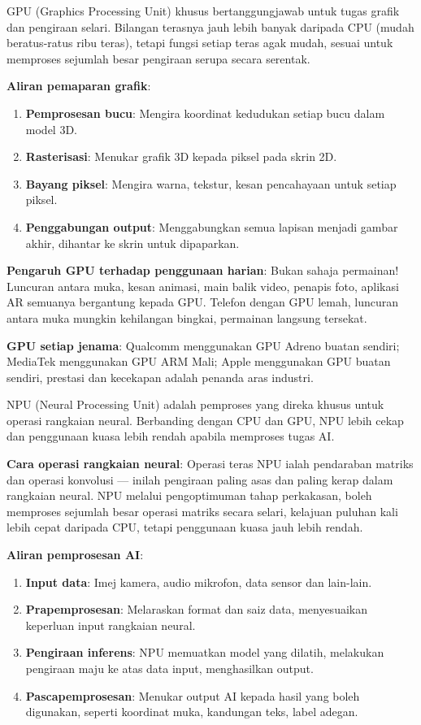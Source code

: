 
GPU (Graphics Processing Unit) khusus bertanggungjawab untuk tugas grafik dan pengiraan selari. Bilangan terasnya jauh lebih banyak daripada CPU (mudah beratus-ratus ribu teras), tetapi fungsi setiap teras agak mudah, sesuai untuk memproses sejumlah besar pengiraan serupa secara serentak.

\textbf{Aliran pemaparan grafik}:

\begin{enumerate}
  \item \textbf{Pemprosesan bucu}: Mengira koordinat kedudukan setiap bucu dalam model 3D.
  \item \textbf{Rasterisasi}: Menukar grafik 3D kepada piksel pada skrin 2D.
  \item \textbf{Bayang piksel}: Mengira warna, tekstur, kesan pencahayaan untuk setiap piksel.
  \item \textbf{Penggabungan output}: Menggabungkan semua lapisan menjadi gambar akhir, dihantar ke skrin untuk dipaparkan.
\end{enumerate}

\textbf{Pengaruh GPU terhadap penggunaan harian}: Bukan sahaja permainan! Luncuran antara muka, kesan animasi, main balik video, penapis foto, aplikasi AR semuanya bergantung kepada GPU. Telefon dengan GPU lemah, luncuran antara muka mungkin kehilangan bingkai, permainan langsung tersekat.

\textbf{GPU setiap jenama}: Qualcomm menggunakan GPU Adreno buatan sendiri; MediaTek menggunakan GPU ARM Mali; Apple menggunakan GPU buatan sendiri, prestasi dan kecekapan adalah penanda aras industri.


NPU (Neural Processing Unit) adalah pemproses yang direka khusus untuk operasi rangkaian neural. Berbanding dengan CPU dan GPU, NPU lebih cekap dan penggunaan kuasa lebih rendah apabila memproses tugas AI.

\textbf{Cara operasi rangkaian neural}: Operasi teras NPU ialah pendaraban matriks dan operasi konvolusi — inilah pengiraan paling asas dan paling kerap dalam rangkaian neural. NPU melalui pengoptimuman tahap perkakasan, boleh memproses sejumlah besar operasi matriks secara selari, kelajuan puluhan kali lebih cepat daripada CPU, tetapi penggunaan kuasa jauh lebih rendah.

\textbf{Aliran pemprosesan AI}:

\begin{enumerate}
  \item \textbf{Input data}: Imej kamera, audio mikrofon, data sensor dan lain-lain.
  \item \textbf{Prapemprosesan}: Melaraskan format dan saiz data, menyesuaikan keperluan input rangkaian neural.
  \item \textbf{Pengiraan inferens}: NPU memuatkan model yang dilatih, melakukan pengiraan maju ke atas data input, menghasilkan output.
  \item \textbf{Pascapemprosesan}: Menukar output AI kepada hasil yang boleh digunakan, seperti koordinat muka, kandungan teks, label adegan.
\end{enumerate}

